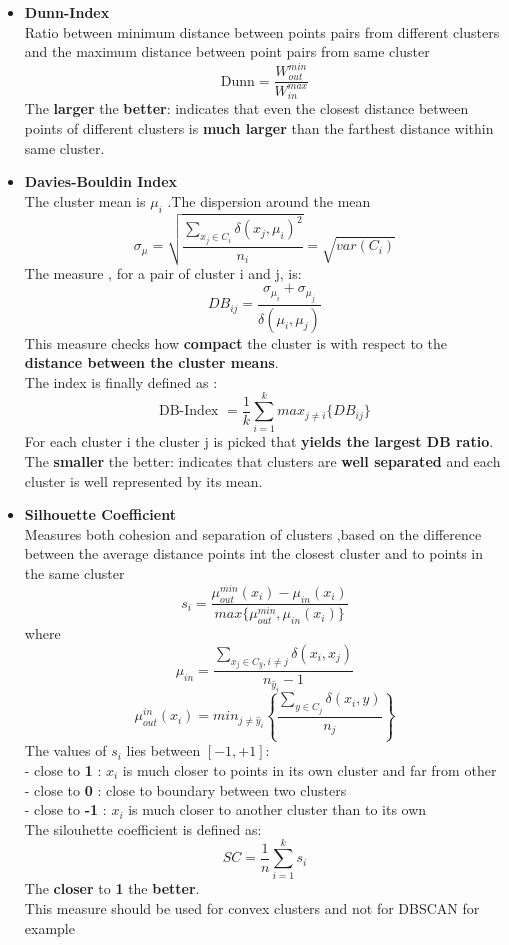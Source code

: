 \begin{description}
\begin{itemize}
\item \textbf{Dunn-Index}\\
Ratio between minimum distance between points pairs from different clusters and the maximum distance between point pairs from same cluster
$$ \text{Dunn} = \frac{W^{min}_{out}}{W^{max}_{in}}$$
The \textbf{larger} the \textbf{better}: indicates that even the closest distance between points of different clusters is \textbf{much larger} than the farthest distance within same cluster.

\item \textbf{Davies-Bouldin Index}\\
The cluster mean is $\mu_i$ .The dispersion around the mean 
$$\sigma_{\mu}= \sqrt{\frac{\sum \limits_{x_j \in C_i} \delta(x_j,\mu_i)^2}{n_i}} = \sqrt{var(C_i)}$$
The measure , for a pair of cluster i and j, is:
$$ DB_{ij} = \frac{\sigma_{\mu_i}+\sigma_{\mu_j}}{\delta(\mu_i,\mu_j)} $$
This measure checks how \textbf{compact} the cluster is with respect to the \textbf{ distance between the cluster means}.\\
The index is finally defined as :
$$ \text{DB-Index } =\frac{1}{k} \sum \limits_{i=1}^k max_{j \neq i} \{ DB_{ij}\}$$
For each cluster i the cluster j is picked that \textbf{yields the largest DB ratio}.\\
The \textbf{smaller} the better: indicates that clusters are \textbf{well separated} and each cluster is well represented by its mean.


\item \textbf{Silhouette Coefficient}\\
Measures both cohesion and separation of clusters ,based on the difference between the average distance points int the closest cluster and to points in the same cluster
$$ s_i = \frac{\mu_{out}^{min} (x_i) - \mu_{in}(x_i)}{max \{ \mu_{out}^{min},\mu_{in}(x_i) \}}$$ 
where 
$$ \mu_{in}= \frac{\sum \limits_{x_j \in C_{\hat{y}}, i \neq j} \delta(x_i,x_j)}{n_{\hat{y}_i}-1}$$
$$ \mu_{out}^{in} (x_i)= min_{j \neq \hat{y}_i} \left\{ \frac{\sum \limits_{y \in C_j} \delta(x_i,y)}{n_j} \right\}$$
The values of $s_i$ lies between $[-1,+1]$:\\
- close to \textbf{1} : $x_i$ is much closer to points in its own cluster and far from other\\
- close to \textbf{0} : close to boundary between two clusters\\
- close to \textbf{-1} : $x_i$ is much closer to another cluster than to its own\\
The silouhette coefficient is defined as:
$$ SC =\frac{1}{n} \sum \limits_{i=1}^k s_i$$
The \textbf{closer} to \textbf{1} the \textbf{better}.\\
This measure should be used for convex clusters and not for DBSCAN for example


\end{itemize}
\end{description}
